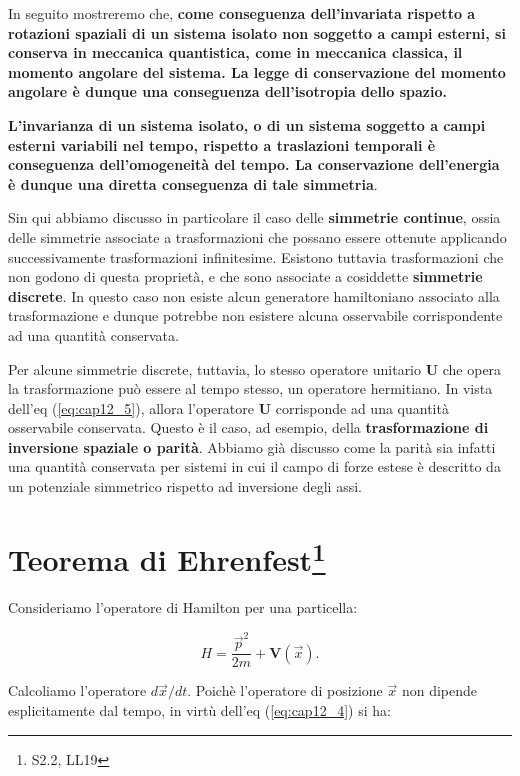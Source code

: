 In seguito mostreremo che, \textbf{come conseguenza dell'invariata rispetto a rotazioni spaziali di un sistema isolato non soggetto a campi esterni, si conserva in meccanica quantistica, come in meccanica classica, il momento angolare del sistema. La legge di conservazione del momento angolare è dunque una conseguenza dell'isotropia dello spazio.}

\textbf{L'invarianza di un sistema isolato, o di un sistema soggetto a campi esterni variabili nel tempo, rispetto a traslazioni temporali è conseguenza dell'omogeneità del tempo. La conservazione dell'energia è dunque una diretta conseguenza di tale simmetria}.

Sin qui abbiamo discusso in particolare il caso delle \textbf{simmetrie continue}, ossia delle simmetrie associate a trasformazioni che possano essere ottenute applicando successivamente trasformazioni infinitesime.
Esistono tuttavia trasformazioni che non godono di questa proprietà, e che sono associate a cosiddette \textbf{simmetrie discrete}. In questo caso non esiste alcun generatore hamiltoniano associato alla trasformazione e dunque potrebbe non esistere alcuna osservabile corrispondente ad una quantità conservata.

Per alcune simmetrie discrete, tuttavia, lo stesso operatore unitario \textbf{U} che opera la trasformazione può essere al tempo stesso, un operatore hermitiano. In vista dell'eq (\ref{eq:cap12_5}), allora l'operatore \textbf{U} corrisponde ad una quantità osservabile conservata. Questo è il caso, ad esempio, della \textbf{trasformazione di inversione spaziale o parità}. Abbiamo già discusso come la parità sia infatti una quantità conservata per sistemi in cui il campo di forze estese è descritto da un potenziale simmetrico rispetto ad inversione degli assi.

\section[Teorema di Ehrenfest]{Teorema di Ehrenfest\footnote{S2.2, LL19}}

Consideriamo l'operatore di Hamilton per una particella:

\begin{equation}
H= \frac{\vec{p}^2}{2m} + \textbf{V}(\vec{x}).
\end{equation}

Calcoliamo l'operatore $d\vec{x}/dt$. Poichè l'operatore di posizione $\vec{x}$ non dipende esplicitamente dal tempo, in virtù dell'eq (\ref{eq:cap12_4}) si ha:

